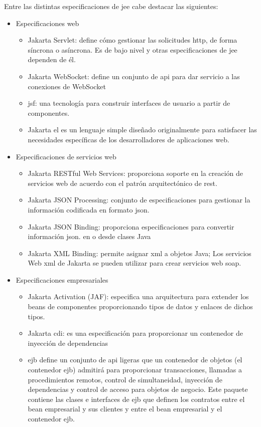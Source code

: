 Entre las distintas especificaciones de \acrshort{jee} cabe destacar las siguientes:

\begin{itemize}
   \item Especificaciones web
     \begin{itemize}
       \item Jakarta Servlet: define cómo gestionar las solicitudes \acrfull{http}, de forma síncrona o asíncrona. Es de bajo nivel y otras especificaciones de \acrshort{jee} dependen de él.
	   \item Jakarta WebSocket: define un conjunto de \acrshort{api} para dar servicio a las conexiones de WebSocket
   	   \item \acrlong{jsf}: una tecnología para construir interfaces de usuario a partir de componentes.
  	   \item Jakarta \acrlong{el} es un lenguaje simple diseñado originalmente para satisfacer las necesidades específicas de los desarrolladores de aplicaciones web.
     \end{itemize} 
   \item Especificaciones de servicios web
     \begin{itemize}
       \item Jakarta RESTful Web Services: proporciona soporte en la creación de servicios web de acuerdo con el patrón arquitectónico de \acrfull{rest}.
  	   \item Jakarta JSON Processing: conjunto de especificaciones para gestionar la información codificada en formato \acrfull{json}.
	   \item Jakarta JSON Binding: proporciona especificaciones para convertir información \acrshort{json}. en o desde clases Java
 	   \item Jakarta XML Binding: permite asignar \acrfull{xml} a objetos Java; Los servicios Web \acrshort{xml} de Jakarta se pueden utilizar para crear servicios web \acrfull{soap}.
     \end{itemize}
   \item Especificaciones empresariales
     \begin{itemize}
        \item Jakarta Activation (JAF): especifica una arquitectura para extender los beans de componentes proporcionando tipos de datos y enlaces de dichos tipos. 
        \item Jakarta \acrfull{cdi}: es una especificación para proporcionar un contenedor de inyección de dependencias
        \item \acrfull{ejb} define un conjunto de \acrshort{api} ligeras que un contenedor de objetos (el contenedor \acrshort{ejb}) admitirá para proporcionar transacciones, llamadas a procedimientos remotos, control de simultaneidad, inyección de dependencias y control de acceso para objetos de negocio. Este paquete contiene las clases e interfaces de \acrshort{ejb} que definen los contratos entre el bean empresarial y sus clientes y entre el bean empresarial y el contenedor ejb. 

\end{itemize}
\end{itemize}
